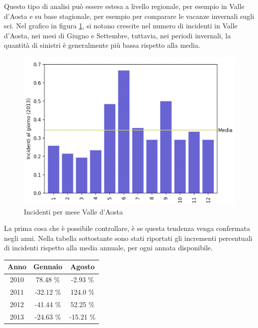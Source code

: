 \documentclass[a4paper,12pt]{report}
\begin{document}
Questo tipo di analisi può essere estesa a livello regionale, 
per esempio in Valle d'Aosta e su base stagionale, per esempio per 
comparare le vacanze invernali sugli sci. 
Nel grafico in figura \ref{fig:aosta}, si notano crescite nel numero di incidenti 
in Valle d'Aosta, nei mesi di Giugno e Settembre, tuttavia, nei periodi invernali, 
la quantità di sinistri è generalmente più bassa rispetto alla media. 

\begin{figure}
    \includegraphics[width=\linewidth]{../src/incidenti/incidenti_senza_coords/mese_incidenti/aosta_mese.png}
    \caption{Incidenti per mese Valle d'Aosta}
    \label{fig:aosta}
\end{figure}

La prima cosa che è possibile controllare, è se questa tendenza venga confermata negli anni. 
Nella tabella sottostante sono stati riportati gli incrementi percentuali di incidenti 
rispetto alla media annuale, per ogni annata disponibile. 

\begin{center}
    \def\arraystretch{1.5}%
    \begin{tabular}{ |c|c|c| } 
    \hline
    Anno & Gennaio & Agosto \\ 
    \hline
    \rowcolor{TableGray}
    2010 & 78.48 \%  & -2.93 \%\\ 
    2011 & -32.12 \% & 124.0 \%\\
    \rowcolor{TableGray}
    2012 & -41.44 \% & 52.25 \% \\
    2013 & -24.63 \% & -15.21 \% \\
    \hline
    \end{tabular}
\end{center}
\end{document}
